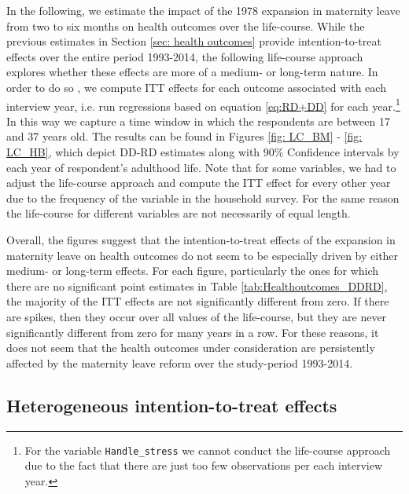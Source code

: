 \documentclass[a4paper ]{article}
\begin{document}
In the following, we estimate the impact of the 1978 expansion in maternity leave from two to six months on health outcomes over the life-course. While the previous estimates in Section \ref{sec: health outcomes} provide intention-to-treat effects over the entire period 1993-2014, the following life-course approach explores whether these effects are more of a medium- or long-term nature. In order to do so , we compute ITT effects for each outcome associated with each interview year, i.e. run regressions based on equation \ref{eq:RD+DD} for each year.\footnote{For the variable \texttt{Handle\_stress} we cannot conduct the life-course approach due to the fact that there are just too few observations per each interview year.} In this way we capture a time window in which the respondents are between 17 and 37 years old. The results can be found in Figures \ref{fig: LC_BM} - \ref{fig: LC_HB}, which depict DD-RD estimates along with 90\% Confidence intervals by each year of respondent's adulthood life. Note that for some variables, we had to adjust the life-course approach and compute the ITT effect for every other year due to the frequency of the variable in the household survey. For the same reason the life-course for different variables are not necessarily of equal length.

Overall, the figures suggest that the intention-to-treat effects of the expansion in maternity leave on health outcomes do not seem to be especially driven by either medium- or long-term effects. For each figure, particularly the ones for which there are no significant point estimates in Table \ref{tab:Healthoutcomes_DDRD}, the majority of the ITT effects are not significantly different from zero. If there are spikes, then they occur over all values of the life-course, but they are never significantly different from zero for many years in a row. For these reasons, it does not seem that the health outcomes under consideration are persistently affected by the maternity leave reform over the study-period 1993-2014. 





\bigskip
\subsection{Heterogeneous intention-to-treat effects}\label{sec: heterogeneous TE}

\end{document}
